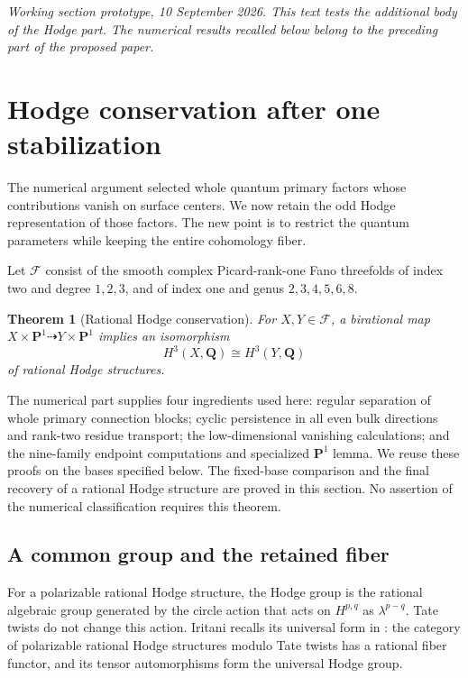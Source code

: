 \documentclass[11pt]{article}
\newtheorem{theorem}{Theorem}
\newcommand{\Q}{\mathbf Q}
\newcommand{\PP}{\mathbf P}
\begin{document}
\noindent\textit{Working section prototype, 10 September 2026. This text
tests the additional body of the Hodge part. The numerical results recalled
below belong to the preceding part of the proposed paper.}

\section{Hodge conservation after one stabilization}

The numerical argument selected whole quantum primary factors whose
contributions vanish on surface centers. We now retain the odd Hodge
representation of those factors. The new point is to restrict the quantum
parameters while keeping the entire cohomology fiber.

Let $\mathcal F$ consist of the smooth complex Picard-rank-one Fano
threefolds of index two and degree $1,2,3$, and of index one and genus
$2,3,4,5,6,8$.

\begin{theorem}[Rational Hodge conservation]
\label{thm:prototype-hodge-conservation}
For $X,Y\in\mathcal F$, a birational map
$X\times\PP^1\dashrightarrow Y\times\PP^1$ implies an isomorphism
\[
 H^3(X,\Q)\cong H^3(Y,\Q)
\]
of rational Hodge structures.
\end{theorem}

The numerical part supplies four ingredients used here: regular separation
of whole primary connection blocks; cyclic persistence in all even bulk
directions and rank-two residue transport; the low-dimensional vanishing
calculations; and the nine-family endpoint computations and specialized
$\PP^1$ lemma. We reuse these proofs on the bases specified below. The
fixed-base comparison and the final recovery of a rational Hodge structure
are proved in this section. No assertion of the numerical classification
requires this theorem.

\subsection{A common group and the retained fiber}

For a polarizable rational Hodge structure, the Hodge group is the rational
algebraic group generated by the circle action that acts on $H^{p,q}$ as
$\lambda^{p-q}$. Tate twists do not change this action. Iritani recalls
its universal form in \cite[Section~3]{IH}: the category of polarizable
rational Hodge structures modulo Tate twists has a rational fiber functor,
and its tensor automorphisms form the universal Hodge group.
\end{document}
